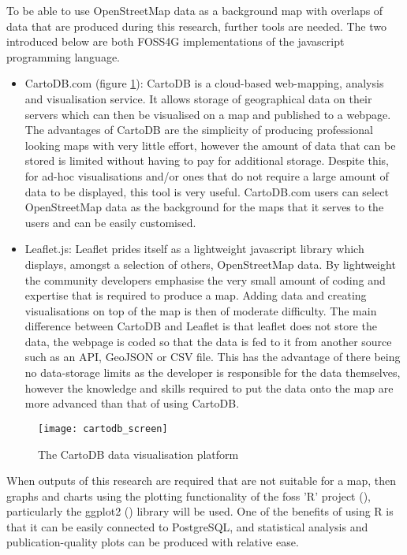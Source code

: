 To be able to use OpenStreetMap data as a background map with overlaps of data that are produced during this research, further tools are needed. The two introduced below are both FOSS4G implementations of the javascript programming language. 

\begin{itemize}
\item CartoDB.com (figure \ref{fig:cartodb_screen}): CartoDB is a cloud-based web-mapping, analysis and visualisation service. It allows storage of geographical data on their servers which can then be visualised on a map and published to a webpage. The advantages of CartoDB are the simplicity of producing professional looking maps with very little effort, however the amount of data that can be stored is limited without having to pay for additional storage. Despite this, for ad-hoc visualisations and/or ones that do not require a large amount of data to be displayed, this tool is very useful. CartoDB.com users can select OpenStreetMap data as the background for the maps that it serves to the users and can be easily customised.
\item Leaflet.js: Leaflet prides itself as a lightweight javascript library which displays, amongst a selection of others, OpenStreetMap data. By lightweight the community developers emphasise the very small amount of coding and expertise that is required to produce a map. Adding data and creating visualisations on top of the map is then of moderate difficulty. The main difference between CartoDB and Leaflet is that leaflet does not store the data, the webpage is coded so that the data is fed to it from another source such as an API, GeoJSON or CSV file. This has the advantage of there being no data-storage limits as the developer is responsible for the data themselves, however the knowledge and skills required to put the data onto the map are more advanced than that of using CartoDB.
\end{itemize}

\begin{figure}[H]
\centering
\texttt{[image: cartodb\_screen]}
\caption{The CartoDB data visualisation platform}
\label{fig:cartodb_screen}
\end{figure}

When outputs of this research are required that are not suitable for a map, then graphs and charts using the plotting functionality of the \gls{foss} 'R' project (\cite{RFoundationforStatisticalComputing2014}), particularly the ggplot2 (\cite{ggplot2}) library will be used. One of the benefits of using R is that it can be easily connected to PostgreSQL, and statistical analysis and publication-quality plots can be produced with relative ease.